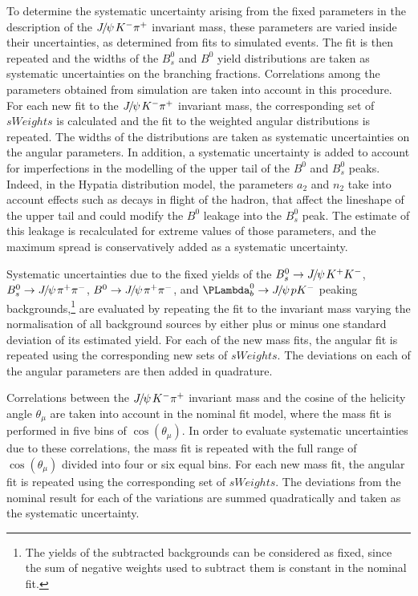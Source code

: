 \documentclass[12pt,a4paper]{article}
\def\thetamu{\ensuremath{\theta_{\mu}}\xspace}
\newcommand{\sweights} {\mbox{$sW\!eights$}\xspace}
\def\PJ      {\ensuremath{J}\xspace}
\def\cosTmu  {\ensuremath{\cos(\theta_{\mu})}\xspace}
\def\Ppsi {\ensuremath{\psi}\xspace}
\def\jpsi     {{\ensuremath{{\PJ\mskip -3mu/\mskip -2mu\Ppsi\mskip 2mu}}}\xspace}
\def\Jpsi     {{\ensuremath{\jpsi}}\xspace}
\newcommand{\Bs}{\ensuremath{B^0_s}\xspace}
\newcommand{\Bd}{\ensuremath{B^0}\xspace}
\newcommand{\Lambdab}{\ensuremath{\PLambda^0_b}\xspace}
\newcommand{\BdJpsipipi}{\ensuremath{B^0\to \jpsi \pi^+\pi^-}\xspace}
\newcommand{\BsJpsipipi}{\ensuremath{B^0_s\to \jpsi \pi^+\pi^-}\xspace}
\newcommand{\BsJpsiKK}{\ensuremath{B^0_s\to \jpsi K^+K^-}\xspace}
\newcommand{\LbJpsipK}{\ensuremath{\Lambdab\to\Jpsi p K^-}\xspace}
\newcommand{\Km}{\ensuremath{K^-}\xspace}
\newcommand{\pip}{\ensuremath{\pi^+}\xspace}
\begin{document}
To determine the systematic uncertainty arising from the fixed parameters in the description of the $\jpsi\Km\pip$ invariant mass, these parameters are varied inside their uncertainties, as determined from fits to simulated events.
The fit is then repeated and the widths of the \Bs and \Bd yield distributions are taken as systematic uncertainties on the branching fractions. 
Correlations among the parameters obtained from simulation are taken into account in this procedure. 
For each new fit to the $\jpsi\Km\pip$ invariant mass, the corresponding set of \sweights is calculated and the fit to the weighted angular distributions is repeated.
The widths of the distributions are taken as systematic uncertainties on the angular parameters.
In addition, a systematic uncertainty is added to account for imperfections in the modelling of the upper tail of the \Bd and \Bs peaks. 
Indeed, in the Hypatia distribution model, the parameters $a_2$ and $n_2$ take into account effects such as decays in flight of the hadron, that affect the lineshape of the upper tail and could modify the \Bd leakage into the \Bs peak. 
The estimate of this leakage is recalculated for extreme values of those parameters, and the maximum spread is conservatively added as a systematic uncertainty. 

Systematic uncertainties due to the fixed yields of the \BsJpsiKK, \mbox{\BsJpsipipi}, \BdJpsipipi, and \LbJpsipK peaking backgrounds,\footnote{The yields of the subtracted backgrounds can be considered as fixed, since the sum of negative weights used to subtract them is constant in the nominal fit.} are evaluated by repeating the fit to the invariant mass varying the normalisation of all background sources by either plus or minus one standard deviation of its estimated yield. 
For each of the new mass fits, the angular fit is repeated using the corresponding new sets of \sweights. 
The deviations on each of the angular parameters are then added in quadrature.

Correlations between the $\jpsi K^-\pi^+$ invariant mass and the cosine of the helicity angle \thetamu are taken into account in the nominal fit model, where the mass fit is performed in five bins of \cosTmu.
In order to evaluate systematic uncertainties due to these correlations, the mass fit is repeated with the full range of \cosTmu divided into four or six equal bins. 
For each new mass fit, the angular fit is repeated using the corresponding set of \sweights. 
The deviations from the nominal result for each of the variations are summed quadratically and taken as the systematic uncertainty. 
\end{document}
